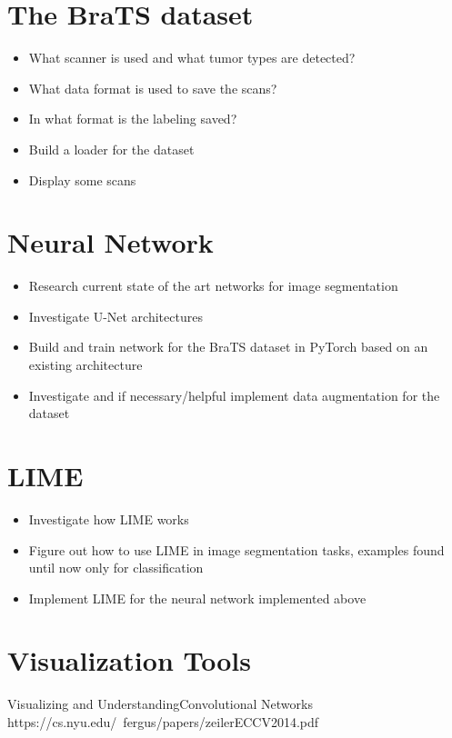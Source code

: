 \section*{The BraTS dataset}
\begin{itemize}
    \item What scanner is used and what tumor types are detected?
    \item What data format is used to save the scans?
    \item In what format is the labeling saved?
    \item Build a loader for the dataset
    \item Display some scans
\end{itemize}

\section*{Neural Network}

\begin{itemize}
    \item Research current state of the art networks for image segmentation
    \item Investigate U-Net architectures
    \item Build and train network for the BraTS dataset in PyTorch based on an existing architecture
    \item Investigate and if necessary/helpful implement data augmentation for the dataset
\end{itemize}




\section*{LIME}
\begin{itemize}
    \item Investigate how LIME works
    \item Figure out how to use LIME in image segmentation tasks, examples found until now only for classification
    \item Implement LIME for the neural network implemented above
\end{itemize}

\section*{Visualization Tools}
Visualizing and UnderstandingConvolutional Networks
https://cs.nyu.edu/~fergus/papers/zeilerECCV2014.pdf

